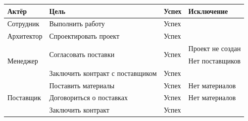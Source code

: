 \begin{table}[]
    \begin{tabular}{|l|l|l|l|}
        \hline
        Актёр                      & Цель                                  & Успех                  & Исключение       \\ \hline
        Сотрудник                  & Выполнить работу                      & Успех                  &                  \\ \hline
        Архитектор                 & Спроектировать проект                 & Успех                  &                  \\ \hline
        \multirow{3}{*}{Менеджер}  & \multirow{2}{*}{Согласовать поставки} & \multirow{2}{*}{Успех} & Проект не создан \\ \cline{4-4}
                                   &                                       &                        & Нет поставщиков  \\ \cline{2-4}
                                   & Заключить контракт с поставщиком      & Успех                  &                  \\ \hline
        \multirow{3}{*}{Поставщик} & Поставить материалы                   & Успех                  & Нет материалов   \\ \cline{2-4}
                                   & Договориться о поставках              & Успех                  & Нет материалов   \\ \cline{2-4}
                                   & Заключить контракт                    & Успех                  &                  \\ \hline
    \end{tabular}
\end{table}
